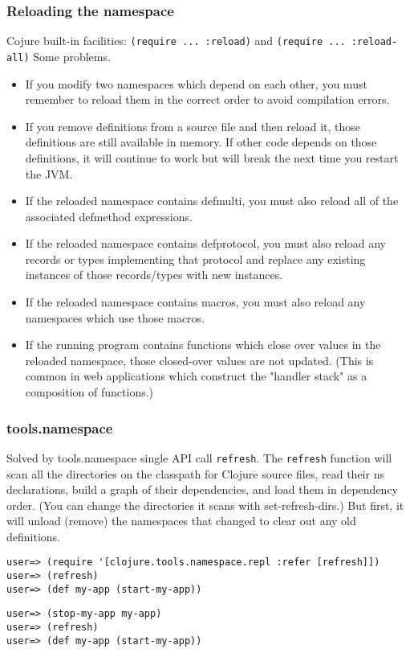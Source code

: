 \documentclass[11pt]{article}
\begin{document}
\subsubsection*{Reloading the namespace}
\label{sec:orgheadline21}
Cojure built-in facilities: \texttt{(require ... :reload)} and \texttt{(require ... :reload-all)} 
Some problems.
\begin{itemize}
\item If you modify two namespaces which depend on each other, you must remember to reload them in the correct order to avoid compilation errors.
\item If you remove definitions from a source file and then reload it, those definitions are still available in memory. If other code depends on those definitions, it will continue to work but will break the next time you restart the JVM.
\item If the reloaded namespace contains defmulti, you must also reload all of the associated defmethod expressions.
\item If the reloaded namespace contains defprotocol, you must also reload any records or types implementing that protocol and replace any existing instances of those records/types with new instances.
\item If the reloaded namespace contains macros, you must also reload any namespaces which use those macros.
\item If the running program contains functions which close over values in the reloaded namespace, those closed-over values are not updated. (This is common in web applications which construct the "handler stack" as a composition of functions.)
\end{itemize}
\subsubsection*{tools.namespace}
\label{sec:orgheadline22}
Solved by tools.namespace single API call \texttt{refresh}.
The \texttt{refresh} function will scan all the directories on the classpath for Clojure source files, read their ns declarations, build a graph of their dependencies, and load them in dependency order. (You can change the directories it scans with set-refresh-dirs.)
But first, it will unload (remove) the namespaces that changed to clear out any old definitions.
\begin{verbatim}
user=> (require '[clojure.tools.namespace.repl :refer [refresh]])
user=> (refresh)
user=> (def my-app (start-my-app))
\end{verbatim}
\begin{verbatim}
user=> (stop-my-app my-app)
user=> (refresh)
user=> (def my-app (start-my-app))
\end{verbatim}
\end{document}
